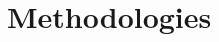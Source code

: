 \documentclass[review]{elsarticle}
\begin{document}







\section{Methodologies}\label{sec:meth}
\end{document}
